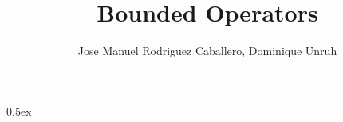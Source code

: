 \documentclass[11pt,a4paper]{article}
\begin{document}
\title{Bounded Operators}
\author{Jose Manuel Rodriguez Caballero, Dominique Unruh}
\maketitle

\tableofcontents

\parindent 0pt\parskip 0.5ex



%
%
\end{document}
